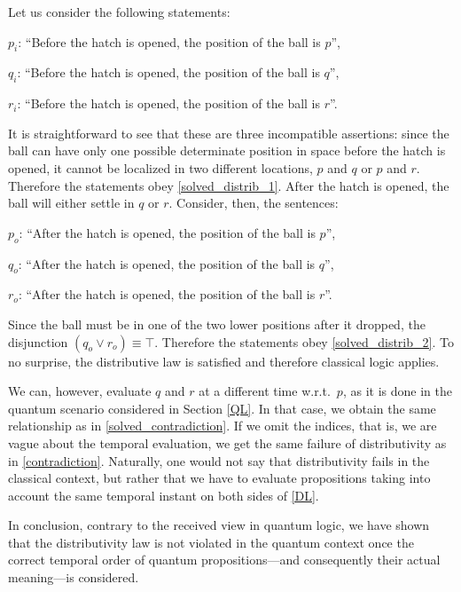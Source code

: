 \documentclass[11pt, executivepaper]{article}
\begin{document}
Let us consider the following statements:
\begin{description}
    \item $p_i$: ``Before the hatch is opened, the position of the ball is $p$'',
    \item $q_i$: ``Before the hatch is opened, the position of the ball is $q$'',
    \item $r_i$: ``Before the hatch is opened, the position of the ball is $r$''.
\end{description}
\noindent It is straightforward to see that these are three incompatible assertions: since the ball can have only one possible determinate position in space before the hatch is opened, it cannot be localized in two different locations, $p$ and $q$ or $p$ and $r$. Therefore the statements obey \eqref{solved_distrib_1}. After the hatch is opened, the ball will either settle in $q$ or $r$. Consider, then, the sentences:
\begin{description}
	\item $p_o$: ``After the hatch is opened, the position of the ball is $p$'',
	\item $q_o$: ``After the hatch is opened, the position of the ball is $q$'',
	\item $r_o$: ``After the hatch is opened, the position of the ball is $r$''.
\end{description}
Since the ball must be in one of the two lower positions after it dropped, the disjunction $(q_o \vee r_o) \equiv \top$. Therefore the statements obey \eqref{solved_distrib_2}. To no surprise, the distributive law is satisfied and therefore classical logic applies.

We can, however, evaluate $q$ and $r$ at a different time w.r.t.\ $p$, as it is done in the quantum scenario considered in Section \ref{QL}. In that case, we obtain the same relationship as in \eqref{solved_contradiction}. If we omit the indices, that is, we are vague about the temporal evaluation, we get the same failure of distributivity as in \eqref{contradiction}. Naturally, one would not say that distributivity fails in the classical context, but rather that we have to evaluate propositions taking into account the same temporal instant on both sides of \eqref{DL}.

In conclusion, contrary to the received view in quantum logic, we have shown that the distributivity law is not violated in the quantum context once the correct temporal order of quantum propositions---and consequently their actual meaning---is considered.
\end{document}
